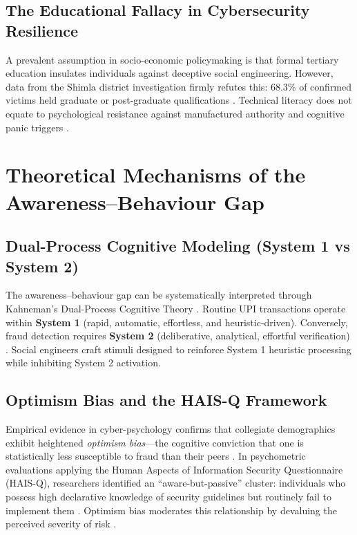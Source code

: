 \documentclass[journal,10pt,twocolumn]{IEEEtran}
\begin{document}
\subsection{The Educational Fallacy in Cybersecurity Resilience}
A prevalent assumption in socio-economic policymaking is that formal tertiary education insulates individuals against deceptive social engineering. However, data from the Shimla district investigation firmly refutes this: 68.3\% of confirmed victims held graduate or post-graduate qualifications \cite{exploratio2026}. Technical literacy does not equate to psychological resistance against manufactured authority and cognitive panic triggers \cite{arxiv2024, exploratio2026}.

\section{Theoretical Mechanisms of the Awareness--Behaviour Gap}

\subsection{Dual-Process Cognitive Modeling (System 1 vs System 2)}
The awareness--behaviour gap can be systematically interpreted through Kahneman's Dual-Process Cognitive Theory \cite{systems2024}. Routine UPI transactions operate within \textbf{System 1} (rapid, automatic, effortless, and heuristic-driven). Conversely, fraud detection requires \textbf{System 2} (deliberative, analytical, effortful verification) \cite{systems2024}. Social engineers craft stimuli designed to reinforce System 1 heuristic processing while inhibiting System 2 activation.

\subsection{Optimism Bias and the HAIS-Q Framework}
Empirical evidence in cyber-psychology confirms that collegiate demographics exhibit heightened \textit{optimism bias}---the cognitive conviction that one is statistically less susceptible to fraud than their peers \cite{emerald2024, sciencedirect2024}. In psychometric evaluations applying the Human Aspects of Information Security Questionnaire (HAIS-Q), researchers identified an ``aware-but-passive'' cluster: individuals who possess high declarative knowledge of security guidelines but routinely fail to implement them \cite{arxiv2024}. Optimism bias moderates this relationship by devaluing the perceived severity of risk \cite{emerald2024, sciencedirect2024}.
\end{document}
